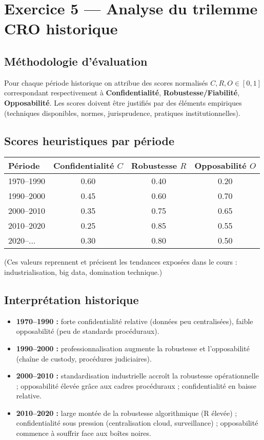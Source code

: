 \documentclass[memoire, 12pt]{report}
\begin{document}
\bigskip

\section{Exercice 5 — Analyse du trilemme CRO historique}

\subsection*{Méthodologie d'évaluation}
Pour chaque période historique on attribue des scores normalisés $C,R,O\in[0,1]$ correspondant respectivement à \textbf{Confidentialité}, \textbf{Robustesse/Fiabilité}, \textbf{Opposabilité}. Les scores doivent être justifiés par des éléments empiriques (techniques disponibles, normes, jurisprudence, pratiques institutionnelles).

\subsection*{Scores heuristiques par période}
\begin{center}
\begin{tabular}{lccc}
\toprule
Période & Confidentialité $C$ & Robustesse $R$ & Opposabilité $O$ \\
\midrule
1970--1990 & 0.60 & 0.40 & 0.20 \\
1990--2000 & 0.45 & 0.60 & 0.70 \\
2000--2010 & 0.35 & 0.75 & 0.65 \\
2010--2020 & 0.25 & 0.85 & 0.55 \\
2020--...  & 0.30 & 0.80 & 0.50 \\
\bottomrule
\end{tabular}
\end{center}
\noindent (Ces valeurs reprennent et précisent les tendances exposées dans le cours : industrialisation, big data, domination technique.)

\subsection*{Interprétation historique}
\begin{itemize}
  \item \textbf{1970--1990 :} forte confidentialité relative (données peu centralisées), faible opposabilité (peu de standards procéduraux).
  \item \textbf{1990--2000 :} professionnalisation augmente la robustesse et l'opposabilité (chaîne de custody, procédures judiciaires).
  \item \textbf{2000--2010 :} standardisation industrielle accroît la robustesse opérationnelle ; opposabilité élevée grâce aux cadres procéduraux ; confidentialité en baisse relative.
  \item \textbf{2010--2020 :} large montée de la robustesse algorithmique (R élevée) ; confidentialité sous pression (centralisation cloud, surveillance) ; opposabilité commence à souffrir face aux boîtes noires.
\end{itemize}
\end{document}
